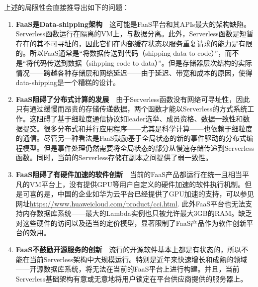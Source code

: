 \documentclass[11pt]{article}
\begin{document}
上述的局限性会直接推导出如下的问题\cite{hellerstein2018serverless}：
\begin{enumerate}
	\item \textbf{FaaS是Data-shipping架构}\ \ 这可能是FaaS平台和其APIs最大的架构缺陷。Serverless函数运行在隔离的VM上，与数据分离。此外，Serverless函数是短暂存在的其不可寻址的，因此它们在内部缓存状态以服务重复请求的能力是有限的。所以FaaS通常是``将数据传送到代码（shipping data to code）''，而不是``将代码传送到数据（sihpping code to data）''。但是存储器层次结构的实际情况——跨越各种存储层和网络延迟——由于延迟、带宽和成本的原因，使得data-shipping是一个糟糕的设计。
	\item \textbf{FaaS阻碍了分布式计算的发展}\ \ 由于Serverless函数没有网络可寻址性，因此只有通过缓慢而昂贵的存储传递数据，两个函数才能以Serverless的方式系统工作。这阻碍了基于细粒度通信协议如leader选举、成员资格、数据一致性和数据提交。很多分布式和并行应用程序——尤其是科学计算——也依赖于细粒度的通信。尽管另一种看法是FaaS鼓励基于全局状态的新的事件驱动的分布式编程模型。但是事件处理仍然需要将全局状态的部分从慢速存储传递到Serverless函数。同时，当前的Serverless存储在副本之间提供了弱一致性。
	\item \textbf{FaaS阻碍了有硬件加速的软件创新}\ \ 当前的FaaS产品都运行在统一且相当平凡的VM平台上，没有提供GPU等用户自定义的硬件加速的软件执行机制。但是可喜的是，中国的企业如华为云平台已经提供了GPU加速的支持，可以参见网址\url{https://www.huaweicloud.com/product/cci.html}. 此外FaaS平台也无法支持内存数据库系统——最大的Lambda实例也只被允许最大3GB的RAM。缺乏对这些硬件的访问以及适当的定价模型，显著限制了FaaS产品作为软件创新平台的效用。
	\item \textbf{FaaS不鼓励开源服务的创新}\ \ 流行的开源软件基本上都是有状态的，所以不能在当前Serverless架构中大规模运行。特别是近年来快速增长和成熟的领域——开源数据库系统，将无法在当前的FaaS平台上进行构建。并且，当前Serverless基础架构有意或无意地将用户锁定在平台供应商提供的服务器上。
\end{enumerate}
\end{document}
